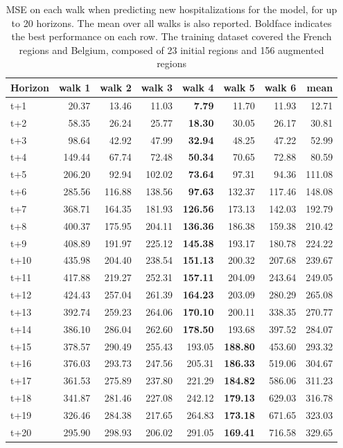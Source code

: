 \begin{table}[H]
\centering
\caption{MSE on each walk when predicting new hospitalizations for the model, for up to 20 horizons. The mean over all walks is also reported. Boldface indicates the best performance on each row. The training dataset covered the French regions and Belgium, composed of 23 initial regions and 156 augmented regions }
\label{tab:MSE_walk_dense_model}
\begin{tabular}{lrrrrrrr}
\toprule
Horizon &  walk 1 &  walk 2 &  walk 3 &  walk 4 &  walk 5 &  walk 6 &   mean \\
\midrule
t+1  & 20.37  & 13.46  & 11.03  & \textbf{7.79}  & 11.70  & 11.93  & 12.71  \\
t+2  & 58.35  & 26.24  & 25.77  & \textbf{18.30}  & 30.05  & 26.17  & 30.81  \\
t+3  & 98.64  & 42.92  & 47.99  & \textbf{32.94}  & 48.25  & 47.22  & 52.99  \\
t+4  & 149.44  & 67.74  & 72.48  & \textbf{50.34}  & 70.65  & 72.88  & 80.59  \\
t+5  & 206.20  & 92.94  & 102.02  & \textbf{73.64}  & 97.31  & 94.36  & 111.08  \\
t+6  & 285.56  & 116.88  & 138.56  & \textbf{97.63}  & 132.37  & 117.46  & 148.08  \\
t+7  & 368.71  & 164.35  & 181.93  & \textbf{126.56}  & 173.13  & 142.03  & 192.79  \\
t+8  & 400.37  & 175.95  & 204.11  & \textbf{136.36}  & 186.38  & 159.38  & 210.42  \\
t+9  & 408.89  & 191.97  & 225.12  & \textbf{145.38}  & 193.17  & 180.78  & 224.22  \\
t+10  & 435.98  & 204.40  & 238.54  & \textbf{151.13}  & 200.32  & 207.68  & 239.67  \\
t+11  & 417.88  & 219.27  & 252.31  & \textbf{157.11}  & 204.09  & 243.64  & 249.05  \\
t+12  & 424.43  & 257.04  & 261.39  & \textbf{164.23}  & 203.09  & 280.29  & 265.08  \\
t+13  & 392.74  & 259.23  & 264.06  & \textbf{170.10}  & 200.11  & 338.35  & 270.77  \\
t+14  & 386.10  & 286.04  & 262.60  & \textbf{178.50}  & 193.68  & 397.52  & 284.07  \\
t+15  & 378.57  & 290.49  & 255.43  & 193.05  & \textbf{188.80}  & 453.60  & 293.32  \\
t+16  & 376.03  & 293.73  & 247.56  & 205.31  & \textbf{186.33}  & 519.06  & 304.67  \\
t+17  & 361.53  & 275.89  & 237.80  & 221.29  & \textbf{184.82}  & 586.06  & 311.23  \\
t+18  & 341.87  & 281.46  & 227.08  & 242.12  & \textbf{179.13}  & 629.03  & 316.78  \\
t+19  & 326.46  & 284.38  & 217.65  & 264.83  & \textbf{173.18}  & 671.65  & 323.03  \\
t+20  & 295.90  & 298.93  & 206.02  & 291.05  & \textbf{169.41}  & 716.58  & 329.65  \\

\bottomrule
\end{tabular}
\end{table}
